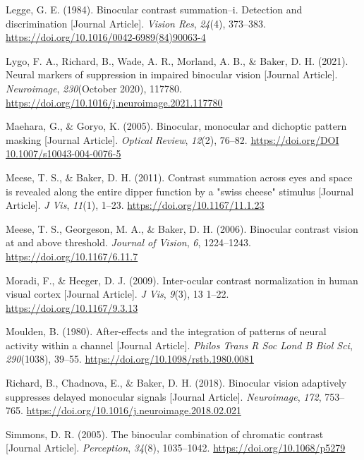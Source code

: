 \documentclass[
  12pt,
]{article}
\newlength{\cslhangindent}
\newenvironment{CSLReferences}[2] %
 {\begin{list}{}{%
  \setlength{\itemindent}{0pt}
  \setlength{\leftmargin}{0pt}
  \setlength{\parsep}{0pt}
  \ifodd #1
   \setlength{\leftmargin}{\cslhangindent}
   \setlength{\itemindent}{-1\cslhangindent}
  \fi
  \setlength{\itemsep}{#2\baselineskip}}}
 {\end{list}}
\begin{document}
\begin{CSLReferences}{1}{0}
Legge, G. E. (1984). Binocular contrast summation--i. Detection and
discrimination {[}Journal Article{]}. \emph{Vision Res}, \emph{24}(4),
373--383. \url{https://doi.org/10.1016/0042-6989(84)90063-4}

Lygo, F. A., Richard, B., Wade, A. R., Morland, A. B., \& Baker, D. H.
(2021). Neural markers of suppression in impaired binocular vision
{[}Journal Article{]}. \emph{Neuroimage}, \emph{230}(October 2020),
117780. \url{https://doi.org/10.1016/j.neuroimage.2021.117780}

Maehara, G., \& Goryo, K. (2005). Binocular, monocular and dichoptic
pattern masking {[}Journal Article{]}. \emph{Optical Review},
\emph{12}(2), 76--82.
\href{https://doi.org/DOI\%2010.1007/s10043-004-0076-5}{https://doi.org/DOI
10.1007/s10043-004-0076-5}

Meese, T. S., \& Baker, D. H. (2011). Contrast summation across eyes and
space is revealed along the entire dipper function by a "swiss cheese"
stimulus {[}Journal Article{]}. \emph{J Vis}, \emph{11}(1), 1--23.
\url{https://doi.org/10.1167/11.1.23}

Meese, T. S., Georgeson, M. A., \& Baker, D. H. (2006). Binocular
contrast vision at and above threshold. \emph{Journal of Vision},
\emph{6}, 1224--1243. \url{https://doi.org/10.1167/6.11.7}

Moradi, F., \& Heeger, D. J. (2009). Inter-ocular contrast normalization
in human visual cortex {[}Journal Article{]}. \emph{J Vis}, \emph{9}(3),
13 1--22. \url{https://doi.org/10.1167/9.3.13}

Moulden, B. (1980). After-effects and the integration of patterns of
neural activity within a channel {[}Journal Article{]}. \emph{Philos
Trans R Soc Lond B Biol Sci}, \emph{290}(1038), 39--55.
\url{https://doi.org/10.1098/rstb.1980.0081}

Richard, B., Chadnova, E., \& Baker, D. H. (2018). Binocular vision
adaptively suppresses delayed monocular signals {[}Journal Article{]}.
\emph{Neuroimage}, \emph{172}, 753--765.
\url{https://doi.org/10.1016/j.neuroimage.2018.02.021}

Simmons, D. R. (2005). The binocular combination of chromatic contrast
{[}Journal Article{]}. \emph{Perception}, \emph{34}(8), 1035--1042.
\url{https://doi.org/10.1068/p5279}


\end{CSLReferences}
\end{document}
